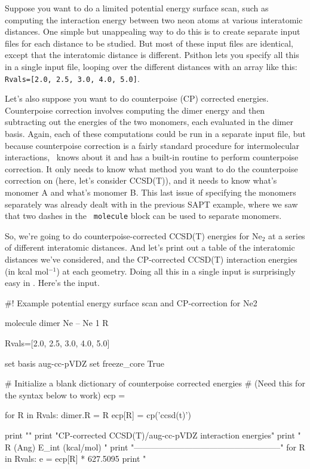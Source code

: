 Suppose you want to do a limited potential energy surface scan, such as
computing the interaction energy between two neon atoms at various
interatomic distances.  One simple but unappealing way to do this is to
create separate input files for each distance to be studied.  But most of
these input files are identical, except that the interatomic distance is
different.  Psithon lets you specify all this in a single input file,
looping over the different distances with an array like this: {\tt
Rvals=[2.0, 2.5, 3.0, 4.0, 5.0]}.

Let's also suppose you want to do counterpoise (CP) corrected energies.
Counterpoise correction involves computing the dimer energy and then
subtracting out the energies of the two monomers, each evaluated in the
dimer basis.  Again, each of these computations could be run in a separate
input file, but because counterpoise correction is a fairly standard
procedure for intermolecular interactions, \PSIfour\ knows about it and has
a built-in routine to perform counterpoise correction.  It only needs to
know what method you want to do the counterpoise correction on (here, let's
consider CCSD(T)), and it needs to know what's monomer A and what's monomer
B.  This last issue of specifying the monomers separately was already dealt
with in the previous SAPT example, where we saw that two dashes in the {\tt
molecule} block can be used to separate monomers.

So, we're going to do counterpoise-corrected CCSD(T) energies for Ne$_2$ at
a series of different interatomic distances.  And let's print out a table
of the interatomic distances we've considered, and the CP-corrected CCSD(T)
interaction energies (in kcal mol$^{-1}$) at each geometry.  Doing all this
in a single input is surprisingly easy in \PSIfour.  Here's the input.

\begin{Snippet}
#! Example potential energy surface scan and CP-correction for Ne2

molecule dimer {
  Ne
--
  Ne 1 R
}

Rvals=[2.0, 2.5, 3.0, 4.0, 5.0]

set basis aug-cc-pVDZ
set freeze_core True

# Initialize a blank dictionary of counterpoise corrected energies
# (Need this for the syntax below to work)
ecp = {}

for R in Rvals:
  dimer.R = R
  ecp[R] = cp('ccsd(t)')

print "\n"
print "CP-corrected CCSD(T)/aug-cc-pVDZ interaction energies\n\n"
print "        R (Ang)         E_int (kcal/mol)             \n"
print "-----------------------------------------------------\n"
for R in Rvals:
  e = ecp[R] * 627.5095
  print "        %
\end{Snippet}


